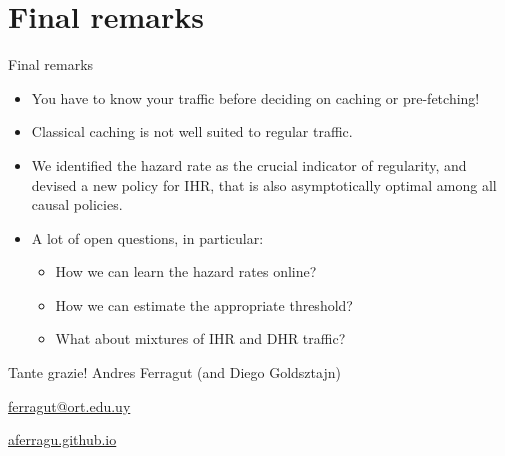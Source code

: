 \documentclass[aspectratio=169]{beamer}
\newenvironment*{myitem}[1][1.5em]{\begin{itemize}\setlength{\itemsep}{#1}}{\end{itemize}}
\begin{document}
\section{Final remarks}

\begin{frame}{Final remarks}
	
	\begin{myitem}[2em]
		\item<1-> You have to \alert{know your traffic} before deciding on caching or pre-fetching!
		
		\item<2-> Classical caching is \alert{not well suited} to regular traffic.
		
		\item<3-> We identified the \alert{hazard rate} as the crucial indicator of regularity, and devised a new policy for IHR, that is also \alert{asymptotically optimal} among all causal policies.
		
		\item<4-> A lot of open questions, in particular:
		
		\pause

		\begin{itemize}
			\item How we can learn the hazard rates online?
			\item How we can estimate the appropriate threshold?
			\item What about mixtures of IHR and DHR traffic?
		\end{itemize}

		\pause


	\end{myitem}
\end{frame}


\begin{frame}[plain]
	\vfill
	{\Huge \alert{Tante grazie!}}
	\vfill
	Andres Ferragut (and Diego Goldsztajn)

	\smallskip

	\href{mailto://ferragut@ort.edu.uy}{\alert{ferragut@ort.edu.uy}}
	
	\smallskip

	\href{http://aferragu.github.io}{\alert{aferragu.github.io}}
\end{frame}
\end{document}
